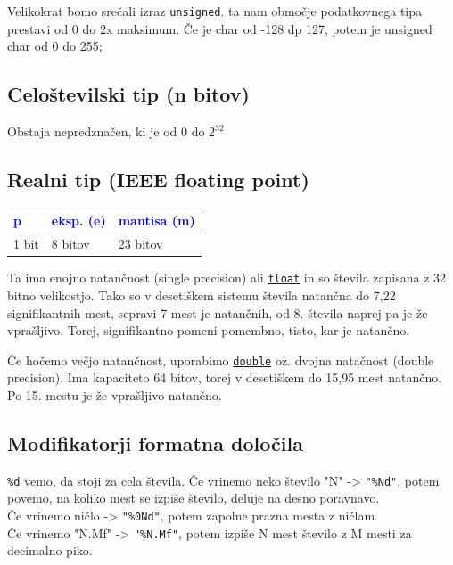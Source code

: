 \documentclass[a4paper, 12pt]{article}
\begin{document}
Velikokrat bomo srečali izraz \lstinline|unsigned|. ta nam območje podatkovnega tipa prestavi od 0 do 2x maksimum. Če je char od -128 dp 127, potem je unsigned char od 0 do 255;

\subsection{Celoštevilski tip (n bitov)}

Obstaja nepredznačen, ki je od 0 do $2^{32}$

\subsection{Realni tip (IEEE floating point)}

\begin{center}
	\begin{tabular}{|l|l|l|}
		\hline \textcolor{blue}{p} & \textcolor{blue}{eksp. (e)} & \textcolor{blue}{mantisa (m)} \\ \hline
		1 bit & 8 bitov & 23 bitov \\ \hline
	\end{tabular}
\end{center}

Ta ima enojno natančnost (single precision) ali \underline{\texttt{float}} in so števila zapisana z 32 bitno velikostjo. Tako so v desetiškem sistemu števila natančna do 7,22 signifikantnih mest, sepravi 7 mest je natančnih, od 8. števila naprej pa je že vprašljivo. Torej, signifikantno pomeni pomembno, tisto, kar je natančno.\

Če hočemo večjo natančnost, uporabimo \underline{\texttt{double}} oz. dvojna natačnost (double precision). Ima kapaciteto 64 bitov, torej v desetiškem do 15,95 mest natančno. Po 15. mestu je že vprašljivo natančno.


\subsection{Modifikatorji formatna določila}

\texttt{\%d} vemo, da stoji za cela števila. Če vrinemo neko število "N" -> \texttt{"\%Nd"}, potem povemo, na koliko mest se izpiše število, deluje na desno poravnavo.\\
Če vrinemo ničlo -> \texttt{"\%0Nd"}, potem zapolne prazna mesta z ničlam.\\
Če vrinemo "N.Mf" -> \texttt{"\%N.Mf"}, potem izpiše N mest število z M mesti za decimalno piko.
\end{document}
